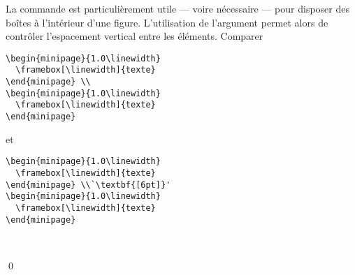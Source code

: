 \begin{exemple}
  La commande {\bs\bs} est particulièrement utile --- voire nécessaire
  --- pour disposer des boîtes à l'intérieur d'une figure.
  L'utilisation de l'argument  permet alors de
  contrôler l'espacement vertical entre les éléments. Comparer
  \begin{demo}
    \begin{texample}[0.55\linewidth]
\begin{lstlisting}
\begin{minipage}{1.0\linewidth}
  \framebox[\linewidth]{texte}
\end{minipage} \\
\begin{minipage}{1.0\linewidth}
  \framebox[\linewidth]{texte}
\end{minipage}
\end{lstlisting}
      \producing
      \begin{minipage}{1.0\linewidth}
      \end{minipage}
      \begin{minipage}{1.0\linewidth}
      \end{minipage}
    \end{texample}
  \end{demo}
  et
  \begin{demo}
    \begin{texample}[0.55\linewidth]
\begin{lstlisting}
\begin{minipage}{1.0\linewidth}
  \framebox[\linewidth]{texte}
\end{minipage} \\`\textbf{[6pt]}'
\begin{minipage}{1.0\linewidth}
  \framebox[\linewidth]{texte}
\end{minipage}
\end{lstlisting}
      \producing
      \begin{minipage}{1.0\linewidth}
      \end{minipage} \\[6pt]
      \begin{minipage}{1.0\linewidth}
      \end{minipage}
    \end{texample}
  \end{demo}
  \qed
\end{exemple}

